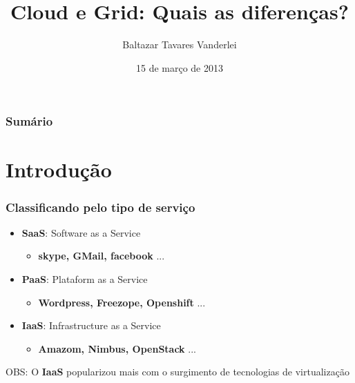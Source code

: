 \documentclass[10pt]{beamer}
\title[]{\textbf{Cloud} e \textbf{Grid}: Quais as diferenças?}
\author[]{Baltazar Tavares Vanderlei}
\date{15 de março de 2013}
\institute[2013]{Laboratório de Computação Científica e Visualização - LCCV/UFAL}
\begin{document}
\newcommand{\til}{\~{}}

\frame{\titlepage}
	\begin{frame}[t]
	\frametitle{Sumário}
	\tableofcontents[framebreaks]
\end{frame}



\section{Introdução}
	\begin{frame}%
	\frametitle{Classificando pelo tipo de serviço}
		\begin{itemize}%
			\item \textbf{\textbf{SaaS}}: Software as a Service
			\begin{itemize}
				\item \textbf{skype, GMail, facebook} ...
			\end{itemize}
			\item \textbf{\textbf{PaaS}}: Plataform as a Service
			\begin{itemize}
				\item \textbf{Wordpress, Freezope, Openshift} ...
			\end{itemize}
			\item \textbf{\textbf{IaaS}}: Infrastructure as a Service
			\begin{itemize}
				\item \textbf{Amazom, \textbf{Nimbus}, \textbf{OpenStack}} ...
			\end{itemize}
		\end{itemize}
		\pause
		\begin{block}{OBS:}
			O \textbf{IaaS} popularizou mais com o surgimento de tecnologias de virtualização
		\end{block}
	\end{frame}
\end{document}
